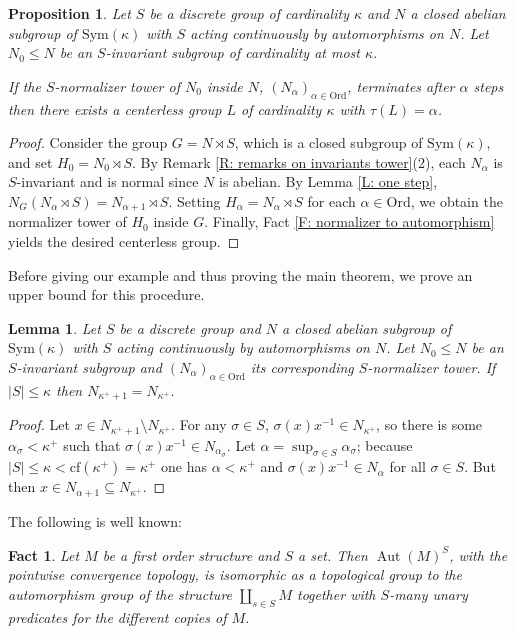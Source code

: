 \documentclass[11pt]{amsart}
\theoremstyle{plain}
\newtheorem{lemma}[theorem]{Lemma}
\newtheorem{proposition}[theorem]{Proposition}
\newtheorem{fact}[theorem]{Fact}
\theoremstyle{definition}
\newcounter{step}
\DeclareMathOperator{\aut}{Aut}
\begin{document}
\begin{proposition}\label{P:from action to automorphism}
Let $S$ be a discrete group of cardinality $\kappa$ and $N$ a closed abelian subgroup of $\mathrm{Sym}(\kappa)$ with $S$ acting continuously by automorphisms on $N$. Let $N_0\leq N$ be an  $S$-invariant subgroup of cardinality at most $\kappa$. 
    
    If the $S$-normalizer tower of $N_0$ inside $N$, $(N_\alpha)_{\alpha\in \mathrm{Ord}}$, terminates after $\alpha$ steps then there exists a centerless group $L$ of cardinality $\kappa$ with $\tau(L)=\alpha$. 
\end{proposition}
\begin{proof}
    Consider the group $G=N\rtimes S$, which is a closed subgroup of $\mathrm{Sym}(\kappa)$, and set $H_0=N_0\rtimes S$. By Remark \ref{R: remarks on invariants tower}(2), each $N_\alpha$ is $S$-invariant and is normal since $N$ is abelian. By Lemma \ref{L: one step}, $N_G(N_\alpha\rtimes S)=N_{\alpha+1}\rtimes S$. Setting $H_\alpha=N_\alpha\rtimes S$ for each $\alpha\in \mathrm{Ord}$, we obtain the normalizer tower of $H_0$ inside $G$. Finally, Fact \ref{F: normalizer to automorphism} yields the desired  centerless group.
\end{proof}

Before giving our example and thus proving the main theorem, we prove an upper bound for this procedure.

\begin{lemma}\label{L:discrete-constant above omega1}
    Let $S$ be a discrete group and $N$ a closed abelian subgroup of $\mathrm{Sym}(\kappa)$ with $S$ acting continuously by automorphisms on $N$. Let $N_0\leq N$ be an  $S$-invariant subgroup and $( N_\alpha)_{\alpha\in \mathrm{Ord}}$ its corresponding  $S$-normalizer tower.    If $|S|\leq \kappa$ then $N_{\kappa^+ +1}=N_{\kappa^+}$.
\end{lemma}
\begin{proof}
   Let $x\in N_{\kappa^+ +1}\setminus N_{\kappa^+}$. For any $\sigma\in S$, $\sigma(x)x^{-1}\in N_{\kappa^+}$, so there is some $\alpha_\sigma<\kappa^+$ such that $\sigma(x)x^{-1}\in N_{\alpha_\sigma}$. Let $\alpha=\sup_{\sigma\in S} \alpha_{\sigma}$; because $|S|\leq \kappa<\mathrm{cf}(\kappa^+)=\kappa^+$ one has $\alpha<\kappa^+$ and $\sigma(x)x^{-1}\in N_\alpha$ for all $\sigma \in S$. But then $x\in N_{\alpha+1}\subseteq N_{\kappa^+}$.
\end{proof}


The following is well known:
\begin{fact}\label{F:power as first order}
    Let $M$ be a first order structure and $S$ a set. Then $\aut(M)^S$, with the pointwise convergence topology,  is isomorphic as a topological group to the automorphism group of the structure $\coprod_{s\in S}M$ together with $S$-many unary predicates for the different copies of $M$.
\end{fact}
\end{document}
